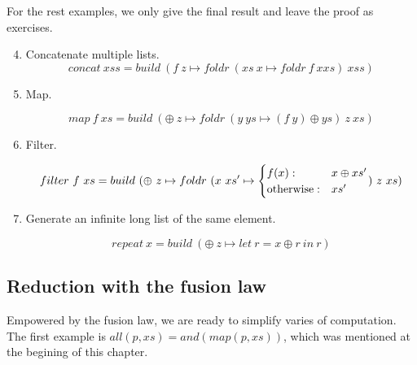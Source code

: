 \documentclass{article}
\begin{document}
For the rest examples, we only give the final result and leave the proof as exercises.

\begin{enumerate}
\setcounter{enumi}{3}
\item Concatenate multiple lists.
\[
concat\ xss = build\ (f\ z \mapsto foldr\ (xs\ x \mapsto foldr\ f\ x xs)\ xss)
\]

\item Map.

\[
map\ f\ xs = build\ (\oplus\ z \mapsto foldr\ (y\ ys \mapsto (f\ y) \oplus ys)\ z\ xs)
\]

\item Filter.

\[
filter\ f\ xs = build\ (\oplus\ z \mapsto foldr\ (x\ xs' \mapsto
  \begin{cases}
    f(x): & x \oplus xs' \\
    \text{otherwise}: & xs' \\
  \end{cases})\ z\ xs) \\
\]

\item Generate an infinite long list of the same element.

\[
repeat\ x = build\ (\oplus\ z \mapsto let\ r = x \oplus r\ in\ r)
\]

\end{enumerate}

\subsection{Reduction with the fusion law}

Empowered by the fusion law, we are ready to simplify varies of computation. The first example is $all(p, xs) = and(map(p, xs))$, which was mentioned at the begining of this chapter.
\end{document}
